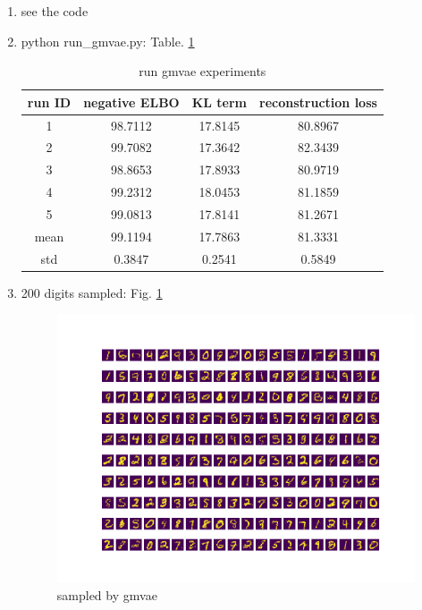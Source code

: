 \documentclass[12pt]{article}
\begin{document}
\begin{enumerate}
	\item 
	see the code
	
	\item 
	python run\_gmvae.py: Table. \ref{table:gmvae}
	
	\begin{table}[ht]
		\label{table:gmvae}
		\caption{run gmvae experiments} %
		\centering %
		\begin{tabular}{c c c c} %
			\hline\hline %
			run ID & negative ELBO & KL term & reconstruction loss \\ [0.5ex] %
			\hline %
			1 & 98.7112 & 17.8145 & 80.8967 \\ %
			2 & 99.7082 & 17.3642 & 82.3439 \\
			3 & 98.8653 &17.8933 & 80.9719 \\
			4 & 99.2312 & 18.0453 & 81.1859 \\
			5 & 99.0813 & 17.8141 &  81.2671 \\ 
			mean & 99.1194 & 17.7863 & 81.3331 \\
			std & 0.3847 & 0.2541 & 0.5849 \\[1ex] %
			\hline %
		\end{tabular}
		\label{table:gmvae} %
	\end{table}
	
	\item 200 digits sampled: Fig. \ref{fig:gmvae}
	\begin{figure}
		\advance\leftskip-4cm
		\includegraphics[scale=1.5]{gmvae.png}
		\caption{sampled by gmvae}
		\label{fig:gmvae}
	\end{figure}
\end{enumerate}
\end{document}
